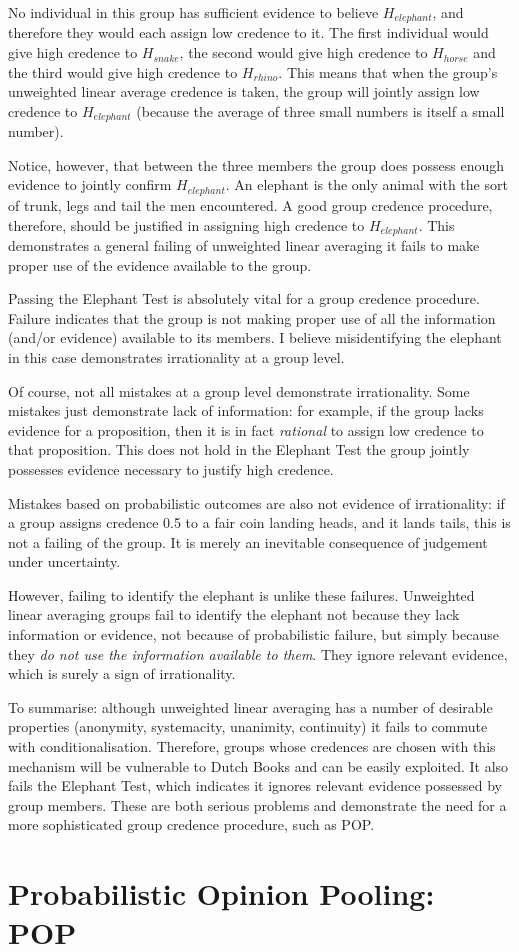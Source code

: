 \documentclass{article}
\begin{document}
No individual in this group has sufficient evidence to believe \(H_{elephant}\), and therefore they would each assign low credence to it. The first individual would give high credence to \(H_{snake}\), the second would give high credence to \(H_{horse}\) and the third would give high credence to \(H_{rhino}\). This means that when the group's unweighted linear average credence is taken, the group will jointly assign low credence to \(H_{elephant}\) (because the average of three small numbers is itself a small number). 

Notice, however, that between the three members the group does possess enough evidence to jointly confirm \(H_{elephant}\). An elephant is the only animal with the sort of trunk, legs and tail the men encountered. A good group credence procedure, therefore, should be justified in assigning high credence to \(H_{elephant}\). This demonstrates a general failing of unweighted linear averaging \textemdash{} it fails to make proper use of the evidence available to the group. 

Passing the Elephant Test is absolutely vital for a group credence procedure. Failure indicates that the group is not making proper use of all the information (and/or evidence) available to its members. I believe misidentifying the elephant in this case demonstrates irrationality at a group level. 

Of course, not all mistakes at a group level demonstrate irrationality. Some mistakes just demonstrate lack of information: for example, if the group lacks evidence for a proposition, then it is in fact \textit{rational} to assign low credence to that proposition. This does not hold in the Elephant Test \textemdash{} the group jointly possesses evidence necessary to justify high credence. 

Mistakes based on probabilistic outcomes are also not evidence of irrationality: if a group assigns credence 0.5 to a fair coin landing heads, and it lands tails, this is not a failing of the group. It is merely an inevitable consequence of judgement under uncertainty. 

However, failing to identify the elephant is unlike these failures. Unweighted linear averaging groups fail to identify the elephant not because they lack information or evidence, not because of probabilistic failure, but simply because they \textit{do not use the information available to them}. They ignore relevant evidence, which is surely a sign of irrationality.

To summarise: although unweighted linear averaging has a number of desirable properties (anonymity, systemacity, unanimity, continuity) it fails to commute with conditionalisation. Therefore, groups whose credences are chosen with this mechanism will be vulnerable to Dutch Books and can be easily exploited. It also fails the Elephant Test, which indicates it ignores relevant evidence possessed by group members. These are both serious problems and demonstrate the need for a more sophisticated group credence procedure, such as POP.

\section{Probabilistic Opinion Pooling: POP}






\end{document}
